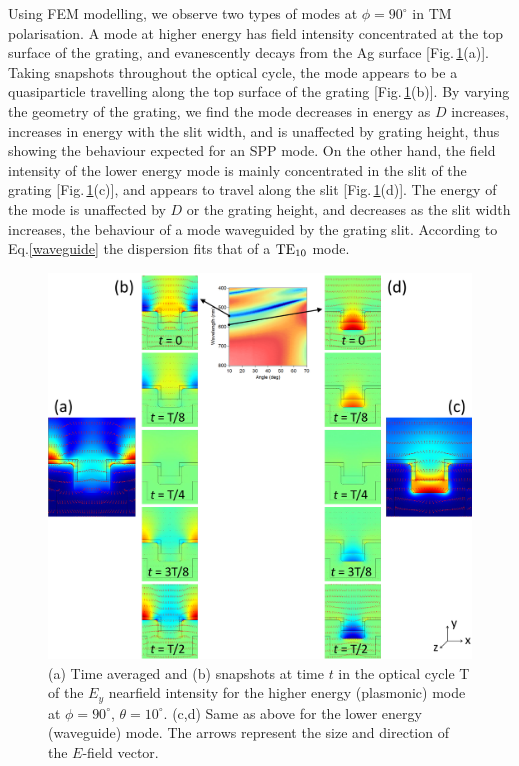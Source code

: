 Using FEM modelling, we observe two types of modes at $\phi=90^{\circ}$ in TM polarisation. A mode at higher energy has field intensity concentrated at the top surface of the grating, and evanescently decays from the Ag surface [Fig.\,\ref{7Fig12}(a)]. Taking snapshots throughout the optical cycle, the mode appears to be a quasiparticle travelling along the top surface of the grating [Fig.\,\ref{7Fig12}(b)]. By varying the geometry of the grating, we find the mode decreases in energy as $D$ increases, increases in energy with the slit width, and is unaffected by grating height, thus showing the behaviour expected for an SPP mode. On the other hand, the field intensity of the lower energy mode is mainly concentrated in the slit of the grating [Fig.\,\ref{7Fig12}(c)], and appears to travel along the slit [Fig.\,\ref{7Fig12}(d)]. The energy of the mode is unaffected by $D$ or the grating height, and decreases as the slit width increases, the behaviour of a mode waveguided by the grating slit. According to Eq.\.\ref{waveguide} the dispersion fits that of a $\textnormal{TE}_{10}$ mode. 
\begin{figure}[h!] 
\centering    
\includegraphics[width=\textwidth]{Fig12}
\caption{(a) Time averaged and (b) snapshots at time $t$ in the optical cycle T of the $E_y$ nearfield intensity for the higher energy (plasmonic) mode at $\phi=90^{\circ}$, $\theta=10^{\circ}$. (c,d) Same as above for the lower energy (waveguide) mode. The arrows represent the size and direction of the $E$-field vector. }
\label{7Fig12}
\end{figure}

